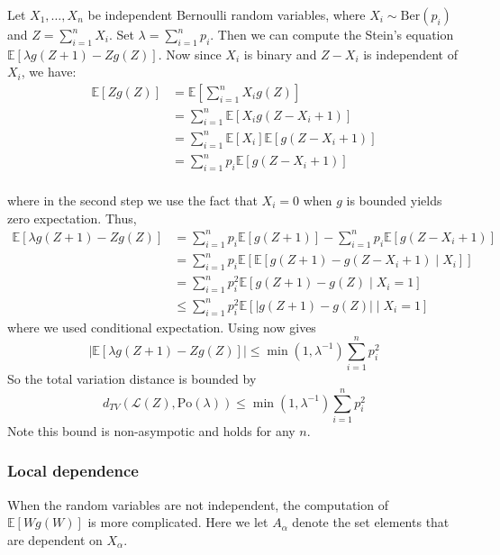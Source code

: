 \documentclass{article}
\begin{document}
\begin{example}\label{ex:bernoulli_poisson}
    Let $X_1, \ldots, X_n$ be independent Bernoulli random variables, where $X_i \sim \text{Ber}(p_i)$ and $Z = \sum_{i=1}^n X_i$. Set $\lambda = \sum_{i=1}^n p_i$. Then we can compute the Stein's equation $\mathbb{E}[\lambda g(Z+1) - Zg(Z)]$.  Now since $X_i$ is binary and $Z-X_i$ is independent of $X_i$, we have:  
    \begin{align*}
        \mathbb{E}[Zg(Z)] &= \mathbb{E}[\sum_{i=1}^n X_i g(Z)]\\
        &= \sum_{i=1}^n \mathbb{E}[X_i g(Z - X_i + 1)]\\
        &= \sum_{i=1}^n \mathbb{E}[X_i] \mathbb{E}[g(Z - X_i + 1)]\\
        &= \sum_{i=1}^n p_i \mathbb{E}[g(Z - X_i + 1)]\\
    \end{align*}

    where in the second step we use the fact that $X_i=0$ when $g$ is bounded yields zero expectation. Thus, 
    \begin{align*}
        \mathbb{E}[\lambda g(Z+1) - Zg(Z)] &= \sum_{i=1}^n p_i \mathbb{E}[g(Z + 1)] - \sum_{i=1}^n p_i \mathbb{E}[g(Z - X_i + 1)]\\
        &= \sum_{i=1}^n p_i \mathbb{E}[\mathbb{E}[g(Z+1) - g(Z - X_i + 1) \mid X_i]]\\
        &= \sum_{i=1}^n p_i^2 \mathbb{E}[g(Z+1) - g(Z) \mid X_i=1]\\
        & \leq \sum_{i=1}^n p_i^2 \mathbb{E}[|g(Z+1) - g(Z)| \mid X_i=1]
    \end{align*}
    where we used conditional expectation.   
    Using  now gives 
    \[|\mathbb{E}[\lambda g(Z+1) - Zg(Z)]| \leq \min (1, \lambda^{-1}) \sum_{i=1}^n p_i^2\]
    So the total variation distance is bounded by
    \begin{equation*}
        d_{TV}(\mathcal{L}(Z), \text{Po}(\lambda)) \leq \min (1, \lambda^{-1}) \sum_{i=1}^n p_i^2
    \end{equation*}
    Note this bound is non-asympotic and holds for any $n$.
\end{example}

\subsubsection{Local dependence}  
When the random variables are not independent, the computation of $\mathbb{E}[Wg(W)]$ is more complicated.  Here we let $A_\alpha$ denote the set elements that are dependent on $X_\alpha$.  
\end{document}
